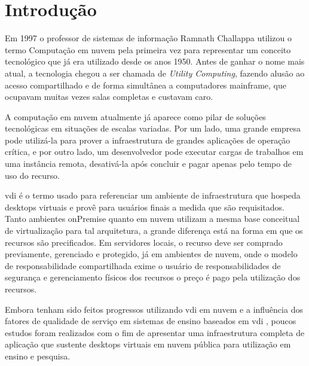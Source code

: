 
\chapter{Introdução}\label{cap:introducao}

Em 1997 o professor de sistemas de informação Ramnath Challappa utilizou o termo Computação em nuvem
pela primeira vez para representar um conceito tecnológico que já era utilizado desde os anos 1950.
Antes de ganhar o nome mais atual, a tecnologia chegou a ser chamada de \textit{Utility Computing},
fazendo alusão ao acesso compartilhado e de forma simultânea a computadores mainframe, que ocupavam
muitas vezes salas completas e custavam caro. \citep{dellcloud}

A computação em nuvem atualmente já aparece como pilar de soluções tecnológicas em situações de
escalas variadas. Por um lado, uma grande empresa pode utilizá-la para prover a infraestrutura de
grandes aplicações de operação crítica, e por outro lado, um desenvolvedor pode executar cargas de
trabalhos em uma instância remota, desativá-la após concluir e pagar apenas pelo tempo de uso do
recurso. \citep{taurioncloud}

\gls{vdi} é o termo usado para referenciar um ambiente de infraestrutura que hospeda \glspl{desktop}
virtuais e provê para usuários finais a medida que são requisitados. Tanto ambientes \gls{onPremise} quanto em nuvem utilizam a mesma
base conceitual de virtualização para tal arquitetura, a grande diferença está na forma em que os
recursos são precificados. Em servidores locais, o recurso deve ser comprado previamente, gerenciado
e protegido, já em ambientes de nuvem, onde o modelo de responsabilidade compartilhada exime o
usuário de responsabilidades de segurança e gerenciamento físicos dos recursos o preço é pago pela
utilização dos recursos. \citep{vmwarevdi}

Embora tenham sido feitos progressos utilizando \gls{vdi} em nuvem e a influência dos fatores de
qualidade de serviço em sistemas de ensino baseados em \gls{vdi} \citep{qoselearning}, poucos
estudos foram realizados com o fim de apresentar uma infraestrutura completa de aplicação que
sustente \glspl{desktop} virtuais em nuvem pública para utilização em ensino e pesquisa.

